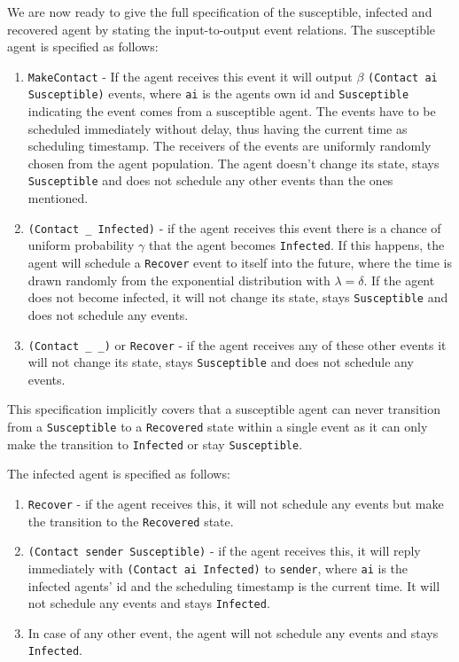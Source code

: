 
We are now ready to give the full specification of the susceptible, infected and recovered agent by stating the input-to-output event relations. The susceptible agent is specified as follows:

\begin{enumerate}
	\item \texttt{MakeContact} - If the agent receives this event it will output $\beta$ \texttt{(Contact ai Susceptible)} events, where \texttt{ai} is the agents own id and \texttt{Susceptible} indicating the event comes from a susceptible agent. The events have to be scheduled immediately without delay, thus having the current time as scheduling timestamp. The receivers of the events are uniformly randomly chosen from the agent population. The agent doesn't change its state, stays \texttt{Susceptible} and does not schedule any other events than the ones mentioned.
	
	\item \texttt{(Contact \_ Infected)} - if the agent receives this event there is a chance of uniform probability $\gamma$ that the agent becomes \texttt{Infected}. If this happens, the agent will schedule a \texttt{Recover} event to itself into the future, where the time is drawn randomly from the exponential distribution with $\lambda = \delta$. If the agent does not become infected, it will not change its state, stays \texttt{Susceptible} and does not schedule any events.
	
	\item \texttt{(Contact \_ \_)} or \texttt{Recover} - if the agent receives any of these other events it will not change its state, stays \texttt{Susceptible} and does not schedule any events.
\end{enumerate}

This specification implicitly covers that a susceptible agent can never transition from a \texttt{Susceptible} to a \texttt{Recovered} state within a single event as it can only make the transition to \texttt{Infected} or stay \texttt{Susceptible}. 

The infected agent is specified as follows:

\begin{enumerate}
	\item \texttt{Recover} - if the agent receives this, it will not schedule any events but make the transition to the \texttt{Recovered} state.
	
	\item \texttt{(Contact sender Susceptible)} - if the agent receives this, it will reply immediately with \texttt{(Contact ai Infected)} to \texttt{sender}, where \texttt{ai} is the infected agents' id and the scheduling timestamp is the current time. It will not schedule any events and stays \texttt{Infected}.
	
	\item In case of any other event, the agent will not schedule any events and stays \texttt{Infected}.
\end{enumerate}

